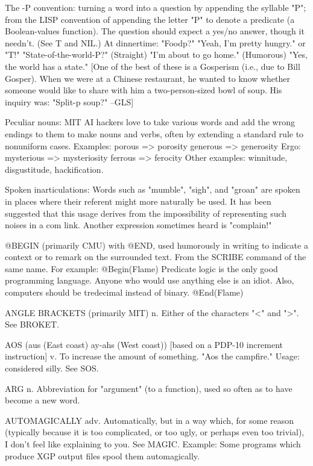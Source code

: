 The -P convention: turning a word into a question by appending the
   syllable "P"; from the LISP convention of appending the letter "P"
   to denote a predicate (a Boolean-values function).  The question
   should expect a yes/no answer, though it needn't.  (See T and NIL.)
     At dinnertime: "Foodp?"  "Yeah, I'm pretty hungry." or "T!"
     "State-of-the-world-P?"  (Straight) "I'm about to go home."
			      (Humorous) "Yes, the world has a state."
   [One of the best of these is a Gosperism (i.e., due to Bill
   Gosper).  When we were at a Chinese restaurant, he wanted to know
   whether someone would like to share with him a two-person-sized
   bowl of soup.  His inquiry was: "Split-p soup?" --GLS]

Peculiar nouns: MIT AI hackers love to take various words and add the
   wrong endings to them to make nouns and verbs, often by extending a
   standard rule to nonuniform cases.  Examples:
		porous => porosity
		generous => generosity
	Ergo:	mysterious => mysteriosity
		ferrous => ferocity
   Other examples:  winnitude, disgustitude, hackification.

Spoken inarticulations:	 Words such as "mumble", "sigh", and "groan"
   are spoken in places where their referent might more naturally be
   used.  It has been suggested that this usage derives from the
   impossibility of representing such noises in a com link.  Another
   expression sometimes heard is "complain!"

@BEGIN (primarily CMU) with @END, used humorously in writing to
   indicate a context or to remark on the surrounded text.  From the
   SCRIBE command of the same name.  For example:
	@Begin(Flame)
	Predicate logic is the only good programming language.
	Anyone who would use anything else is an idiot.	 Also,
	computers should be tredecimal instead of binary.
	@End(Flame)

ANGLE BRACKETS (primarily MIT) n. Either of the characters "<" and
   ">".	 See BROKET.

AOS (aus (East coast) ay-ahs (West coast)) [based on a PDP-10
   increment instruction] v. To increase the amount of something.
   "Aos the campfire."	Usage: considered silly.  See SOS.

ARG n. Abbreviation for "argument" (to a function), used so often as
   to have become a new word.

AUTOMAGICALLY adv. Automatically, but in a way which, for some reason
   (typically because it is too complicated, or too ugly, or perhaps
   even too trivial), I don't feel like explaining to you.  See MAGIC.
   Example: Some programs which produce XGP output files spool them
   automagically.

